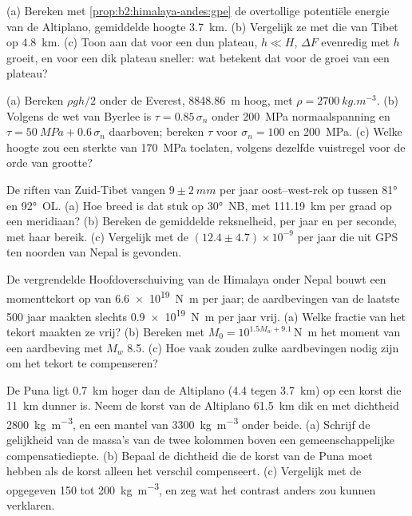 \begin{exercise}[$\star\star$]\label{exo:b2:himalaya-andes:6}
(a) Bereken met \cref{prop:b2:himalaya-andes:gpe} de overtollige potentiële energie van de
Altiplano, gemiddelde hoogte \qty{3.7}{km}. (b) Vergelijk ze met die van Tibet op \qty{4.8}{km}.
(c) Toon aan dat voor een dun plateau, $h \ll H$, $\Delta F$ evenredig met $h$ groeit, en voor een
dik plateau sneller: wat betekent dat voor de groei van een plateau?
\end{exercise}

\begin{exercise}[$\star\star$]\label{exo:b2:himalaya-andes:7}
(a) Bereken $\rho g h/2$ onder de Everest, \qty{8848.86}{m} hoog, met $\rho =
\qty{2700}{kg.m^{-3}}$. (b) Volgens de wet van Byerlee is $\tau = 0.85\,\sigma_n$ onder \qty{200}{MPa}
normaalspanning en $\tau = \qty{50}{MPa} + 0.6\,\sigma_n$ daarboven; bereken $\tau$ voor $\sigma_n =
100$ en \qty{200}{MPa}. (c) Welke hoogte zou een sterkte van \qty{170}{MPa} toelaten, volgens dezelfde
vuistregel voor de orde van grootte?
\end{exercise}

\begin{exercise}[$\star\star$]\label{exo:b2:himalaya-andes:8}
De riften van Zuid-Tibet vangen $9 \pm \qty{2}{mm}$ per jaar oost--west-rek op tussen
\ang{81} en \ang{92}~OL. (a) Hoe breed is dat stuk op \ang{30}~NB, met \qty{111.19}{km} per
graad op een meridiaan? (b) Bereken de gemiddelde reksnelheid, per jaar en per seconde,
met haar bereik. (c) Vergelijk met de $(12.4 \pm 4.7) \times 10^{-9}$ per jaar die uit GPS ten noorden van Nepal is gevonden.
\end{exercise}

\begin{exercise}[$\star\star$]\label{exo:b2:himalaya-andes:9}
De vergrendelde Hoofdoverschuiving van de Himalaya onder Nepal bouwt een momenttekort op van
\qty{6.6e19}{N.m} per jaar; de aardbevingen van de laatste 500 jaar maakten slechts
\qty{0.9e19}{N.m} per jaar vrij. (a) Welke fractie van het tekort maakten ze vrij? (b) Bereken met $M_0 =
10^{1.5 M_w + 9.1}$\,\unit{N.m} het moment van een aardbeving met $M_w$ 8.5. (c) Hoe vaak
zouden zulke aardbevingen nodig zijn om het tekort te compenseren?
\end{exercise}

\begin{exercise}[$\star\star\star$]\label{exo:b2:himalaya-andes:10}
De Puna ligt \qty{0.7}{km} hoger dan de Altiplano (4.4 tegen \qty{3.7}{km}) op een korst die
\qty{11}{km} dunner is. Neem de korst van de Altiplano \qty{61.5}{km} dik en met dichtheid
\qty{2800}{kg.m^{-3}}, en een mantel van \qty{3300}{kg.m^{-3}} onder beide. (a) Schrijf de
gelijkheid van de massa's van de twee kolommen boven een gemeenschappelijke compensatiediepte. (b) Bepaal de
dichtheid die de korst van de Puna moet hebben als de korst alleen het verschil compenseert. (c) Vergelijk
met de opgegeven 150 tot \qty{200}{kg.m^{-3}}, en zeg wat het contrast anders zou kunnen verklaren.
\end{exercise}

